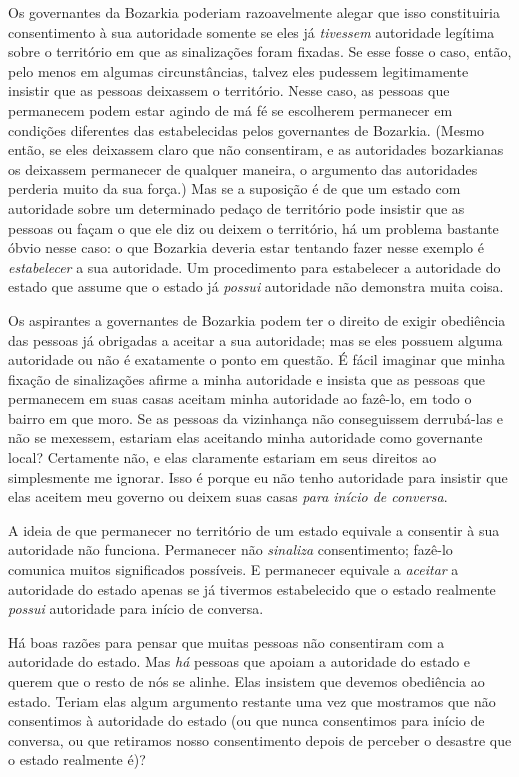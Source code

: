 Os governantes da Bozarkia poderiam razoavelmente alegar que isso constituiria consentimento à sua autoridade somente se eles já \emph{tivessem} autoridade legítima sobre o território em que as sinalizações foram fixadas. Se esse fosse o caso, então, pelo menos em algumas circunstâncias, talvez eles pudessem legitimamente insistir que as pessoas deixassem o território. Nesse caso, as pessoas que permanecem podem estar agindo de má fé se escolherem permanecer em condições diferentes das estabelecidas pelos governantes de Bozarkia. (Mesmo então, se eles deixassem claro que não consentiram, e as autoridades bozarkianas os deixassem permanecer de qualquer maneira, o argumento das autoridades perderia muito da sua força.) Mas se a suposição é de que um estado com autoridade sobre um determinado pedaço de território pode insistir que as pessoas ou façam o que ele diz ou deixem o território, há um problema bastante óbvio nesse caso: o que Bozarkia deveria estar tentando fazer nesse exemplo é \emph{estabelecer} a sua autoridade. Um procedimento para estabelecer a autoridade do estado que assume que o estado já \emph{possui} autoridade não demonstra muita coisa.

Os aspirantes a governantes de Bozarkia podem ter o direito de exigir obediência das pessoas já obrigadas a aceitar a sua autoridade; mas se eles possuem alguma autoridade ou não é exatamente o ponto em questão. É fácil imaginar que minha fixação de sinalizações afirme a minha autoridade e insista que as pessoas que permanecem em suas casas aceitam minha autoridade ao fazê-lo, em todo o bairro em que moro. Se as pessoas da vizinhança não conseguissem derrubá-las e não se mexessem, estariam elas aceitando minha autoridade como governante local? Certamente não, e elas claramente estariam em seus direitos ao simplesmente me ignorar. Isso é porque eu não tenho autoridade para insistir que elas aceitem meu governo ou deixem suas casas \emph{para início de conversa}.

A ideia de que permanecer no território de um estado equivale a consentir à sua autoridade não funciona. Permanecer não \emph{sinaliza} consentimento; fazê-lo comunica muitos significados possíveis. E permanecer equivale a \emph{aceitar} a autoridade do estado apenas se já tivermos estabelecido que o estado realmente \emph{possui} autoridade para início de conversa.

Há boas razões para pensar que muitas pessoas não consentiram com a autoridade do estado. Mas \emph{há} pessoas que apoiam a autoridade do estado e querem que o resto de nós se alinhe. Elas insistem que devemos obediência ao estado. Teriam elas algum argumento restante uma vez que mostramos que não consentimos à autoridade do estado (ou que nunca consentimos para início de conversa, ou que retiramos nosso consentimento depois de perceber o desastre que o estado realmente é)?


